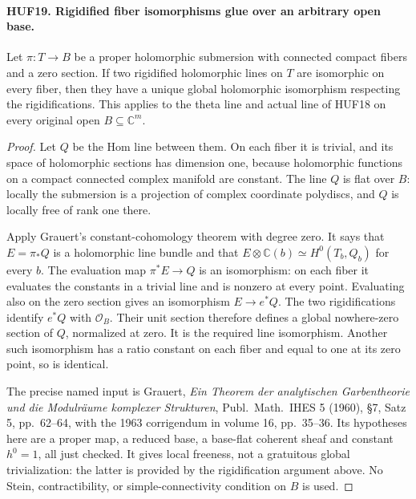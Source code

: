 \paragraph{HUF19. Rigidified fiber isomorphisms glue over an arbitrary open base.}
\label{claim:HUF19}
Let \(\pi:T\to B\) be a proper holomorphic
submersion with connected compact fibers and
a zero section.  If two rigidified holomorphic
lines on \(T\) are isomorphic on every fiber,
then they have a unique global holomorphic
isomorphism respecting the rigidifications.
This applies to the theta line and actual
line of HUF18 on every original open
\(B\subseteq\mathbb C^m\).

\begin{proof}
Let \(Q\) be the Hom line between them.
On each fiber it is trivial, and its space
of holomorphic sections has dimension one,
because holomorphic functions on a compact
connected complex manifold are constant.
The line \(Q\) is flat over \(B\): locally
the submersion is a projection of complex
coordinate polydiscs, and \(Q\) is locally
free of rank one there.

Apply Grauert's constant-cohomology theorem
with degree zero.  It says that
\(E=\pi_*Q\) is a holomorphic line bundle
and that \(E\otimes\mathbb C(b)\simeq
H^0(T_b,Q_b)\) for every \(b\).
The evaluation map \(\pi^*E\to Q\) is
an isomorphism: on each fiber it evaluates
the constants in a trivial line and is
nonzero at every point.  Evaluating also
on the zero section gives an isomorphism
\(E\to e^*Q\).  The two rigidifications
identify \(e^*Q\) with \(\mathcal O_B\).
Their unit section therefore defines a
global nowhere-zero section of \(Q\),
normalized at zero.  It is the required
line isomorphism.  Another such isomorphism
has a ratio constant on each fiber and
equal to one at its zero point, so is
identical.

The precise named input is Grauert,
\emph{Ein Theorem der analytischen
Garbentheorie und die Modulr\"aume komplexer
Strukturen}, Publ.\ Math.\ IHES 5 (1960),
\S7, Satz 5, pp.\ 62--64, with the 1963
corrigendum in volume 16, pp.\ 35--36.
Its hypotheses here are a proper map,
a reduced base, a base-flat coherent sheaf
and constant \(h^0=1\), all just checked.
It gives local freeness, not a gratuitous
global trivialization: the latter is
provided by the rigidification argument
above.  No Stein, contractibility, or
simple-connectivity condition on \(B\)
is used.
\end{proof}

